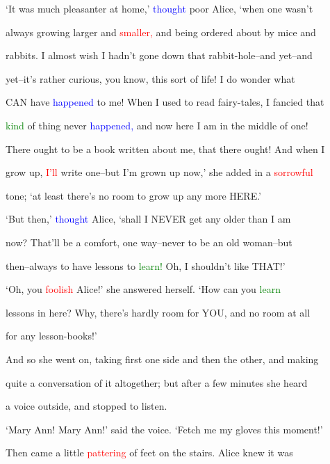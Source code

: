  ‘It was much pleasanter at home,’ \textcolor{blue}{thought} poor Alice, ‘when one wasn’t

 always \textcolor{BurntOrange}{growing} larger and \textcolor{red}{smaller,} and being ordered about by mice and

 rabbits. I almost wish I hadn’t gone down that rabbit-hole--and yet--and

 yet--it’s rather curious, you know, this sort of life! I do wonder what

 CAN have \textcolor{blue}{happened} to me! When I used to read fairy-tales, I \textcolor{BurntOrange}{fancied} that

 \textcolor{green}{kind} of thing never \textcolor{blue}{happened,} and now here I am in the middle of one!

 There ought to be a book written about me, that there ought! And when I

 \textcolor{BurntOrange}{grow} up, \textcolor{red}{I’ll} write one--but I’m grown up now,’ she added in a \textcolor{red}{sorrowful}

 tone; ‘at least there’s no room to \textcolor{BurntOrange}{grow} up any more HERE.’



 ‘But then,’ \textcolor{blue}{thought} Alice, ‘shall I NEVER get any older than I am

 now? That’ll be a \textcolor{BurntOrange}{comfort,} one way--never to be an old woman--but

 then--always to have \textcolor{BurntOrange}{lessons} to \textcolor{green}{learn!} Oh, I shouldn’t like THAT!’



 ‘Oh, you \textcolor{red}{foolish} Alice!’ she answered herself. ‘How can you \textcolor{green}{learn}

 \textcolor{BurntOrange}{lessons} in here? Why, there’s hardly room for YOU, and no room at all

 for any lesson-books!’



 And so she went on, taking first one side and then the other, and making

 quite a conversation of it altogether; but after a few minutes she heard

 a voice outside, and stopped to listen.



 ‘Mary Ann! Mary Ann!’ said the voice. ‘Fetch me my gloves this moment!’

 Then came a little \textcolor{red}{pattering} of feet on the stairs. Alice knew it was

